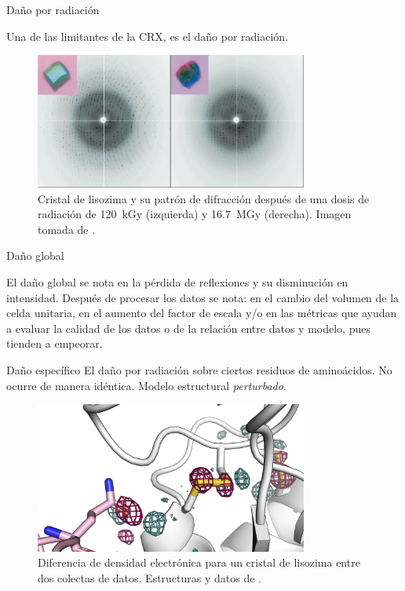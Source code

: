 \documentclass{beamer}
\begin{document}
\begin{frame}{Daño por radiación}

Una de las limitantes de la CRX, es el daño por radiación. 

\begin{figure}[h]
    \centering
    \includegraphics[width=0.8\textwidth]{teng.png}
    \caption{Cristal de lisozima y su patrón de difracción después de una dosis de radiación de \SI{120}{\kilo\gray} (izquierda) y \SI{16.7}{\mega\gray} (derecha). Imagen tomada de \cite{Teng2000}.}
    \label{fig:mesh1}
\end{figure}

\end{frame}

\begin{frame}{Daño global}

El daño global se nota en la pérdida de reflexiones y su disminución en intensidad. Después de procesar los datos se nota: en el cambio del volumen de la celda unitaria, en el aumento del factor de escala y/o en las métricas que ayudan a evaluar la calidad de los datos o de la relación entre datos y modelo, pues tienden a empeorar.

\end{frame}

\begin{frame}{Daño específico}
El daño por radiación sobre ciertos residuos de aminoácidos. No ocurre de manera idéntica. Modelo estructural \emph{perturbado}.

\begin{figure}[h]
	\centering
	\includegraphics[width=0.8\textwidth]{prueba3.png}
	\caption{Diferencia de densidad electrónica para un cristal de lisozima entre dos colectas de datos. Estructuras y datos de \cite{Nanao2005}.}
	\label{fig:mesh1}
\end{figure}

\end{frame}
\end{document}

